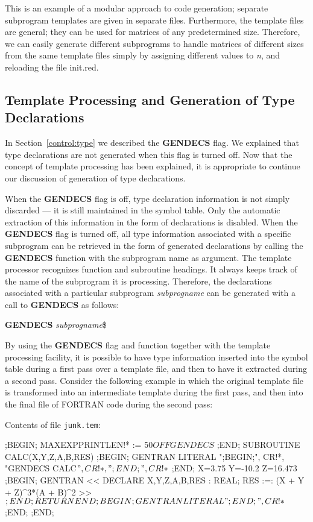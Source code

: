 This is an example of a modular approach to code generation; separate
subprogram templates are given in separate files.  Furthermore, the template
files are general; they can be used for matrices of any predetermined
size.  Therefore, we can easily generate different subprograms to
handle matrices of different sizes from the same template files
simply by assigning different values to {\it n}, and reloading the
file init.red.

\subsection{Template Processing and Generation of Type Declarations}
\label{template:type}
 
In Section~\ref{control:type} we described the {\bf GENDECS} flag.  We
explained that type declarations are not generated when this flag is
turned off.  Now that the concept of template processing has been
explained, it is appropriate to continue our discussion of generation
of type declarations.

When the {\bf GENDECS} flag is off, type declaration information is not
simply discarded --- it is still maintained in the symbol table.  Only the
automatic extraction of this information in the form of declarations is
disabled.  When the {\bf GENDECS} flag is turned off, all type
information associated with a specific subprogram can be retrieved in the
form of generated declarations by calling the {\bf GENDECS} function with
the subprogram name as argument.  The template processor recognizes
function and subroutine headings.  It always keeps track of the name of
the subprogram it is processing.  Therefore, the declarations associated with
a particular subprogram {\it subprogname} can be generated with a call to
{\bf GENDECS} as follows:
\begin{center}
{\bf GENDECS} {\it subprogname}\$
\end{center}

By using the {\bf GENDECS} flag and function together with the template
processing facility, it is possible to have type information
inserted into the symbol table during a first pass over a template file, and
then to have it extracted during a second pass.  Consider the following
example in which the original template file is transformed into an
intermediate template during the first pass, and then into the final file
of FORTRAN code during the second pass:

Contents of file {\tt junk.tem}:
\begin{framedverbatim}
;BEGIN;
MAXEXPPRINTLEN!* := 50$
OFF GENDECS$
;END;
      SUBROUTINE CALC(X,Y,Z,A,B,RES)
;BEGIN;
GENTRAN LITERAL ";BEGIN;", CR!*,
                "GENDECS CALC$", CR!*,
                 ";END;", CR!*$
;END;
      X=3.75
      Y=-10.2
      Z=16.473
;BEGIN;
GENTRAN
<<
    DECLARE X,Y,Z,A,B,RES : REAL;
    RES :=: (X + Y + Z)^3*(A + B)^2
>>$
;END;
      RETURN
      END
;BEGIN;
GENTRAN LITERAL ";END;", CR!*$
;END;
;END;
\end{framedverbatim}

